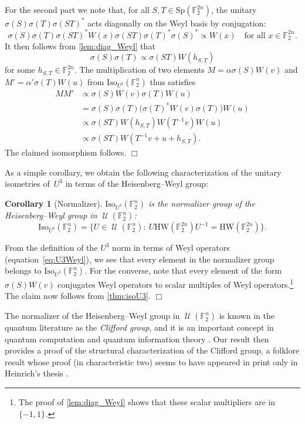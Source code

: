 \documentclass[11pt]{amsart}
\newcommand{\F}{\mathbb{F}} %
\newcommand{\HW}{\mathrm{HW}}
\newcommand{\pmset}[1]{\{-1,1\}^{#1}} %
\newcommand{\Iso}{\mathrm{Iso}}
\newcommand{\Sp}{\mathrm{Sp}}
\DeclareMathOperator{\U}{\mathcal{U}}
\theoremstyle{plain}
\newtheorem{corollary}[theorem]{Corollary}
\theoremstyle{definition}
\theoremstyle{remark}
\renewenvironment{proof}[1][]{
    	\begin{trivlist}
     	\item[\hspace{\labelsep}{\em\noindent Proof#1:\/}]}
     	{{\hfill$\Box$}
    	\end{trivlist}
  }
\begin{document}
\begin{proof}
For the second part we note that, for all $S, T\in \Sp(\F_2^{2n})$, the unitary $\sigma(S)\sigma(T) \sigma(ST)^*$ acts diagonally on the Weyl basis by conjugation:
$$\sigma(S)\sigma(T) \sigma(ST)^* W(x) \sigma(ST) \sigma(T)^*\sigma(S)^* \propto W(x) \quad \text{for all $x\in \F_2^{2n}$.}$$
It then follows from \cref{lem:diag_Weyl} that
$$\sigma(S) \sigma(T) \propto \sigma(ST) W(h_{S,T})$$
for some $h_{S,T} \in \F_2^{2n}$.
The multiplication of two elements $M = \alpha \sigma(S)W(v)$ and $M' = \alpha' \sigma(T)W(u)$ from $\Iso_{U^3}(\F_2^n)$ thus satisfies
\begin{align*}
    MM' &\propto \sigma(S)W(v) \sigma(T)W(u) \\
    &= \sigma(S)\sigma(T) \big(\sigma(T)^* W(v)\sigma(T)\big) W(u) \\
    &\propto \sigma(ST) W(h_{S,T}) W(T^{-1}v) W(u) \\
    &\propto \sigma(ST) W(T^{-1}v+u+h_{S,T}).
\end{align*}
The claimed isomorphism follows.
\end{proof}

As a simple corollary, we obtain the following characterization of the unitary isometries of~$U^3$ in terms of the Heisenberg--Weyl group:

\begin{corollary}[Normalizer] \label{cor:normalizer}
    $\Iso_{U^3}(\F_2^n)$ is the normalizer group of the Heisenberg--Weyl group in $\U(\F_2^n)$:
    $$\Iso_{U^3}(\F_2^n) = \big\{U\in \U(\F_2^n):\: U\HW(\F_2^{2n})U^{-1} = \HW(\F_2^{2n})\big\}.$$
\end{corollary}

\begin{proof}
From the definition of the $U^3$ norm in terms of Weyl operators (equation~\eqref{eq:U3Weyl}), we see that every element in the normalizer group belongs to $\Iso_{U^3}(\F_2^n)$.
For the converse, note that every element of the form $\sigma(S)W(v)$ conjugates Weyl operators to scalar multiples of Weyl operators.\footnote{The proof of \cref{lem:diag_Weyl} shows that these scalar multipliers are in $\pmset{}$.}
The claim now follows from \cref{thm:isoU3}.
\end{proof}

The normalizer of the Heisenberg--Weyl group in $\U(\F_2^n)$ is known in the quantum literature as the \emph{Clifford group}, and it is an important concept in quantum computation and quantum information theory \cite{Gottesman1997, Gross2021}.
Our result then provides a proof of the structural characterization of the Clifford group, a folklore result whose proof (in characteristic two) seems to have appeared in print only in Heinrich's thesis \cite[Chapter~4]{heinrich2021}.
\end{document}
